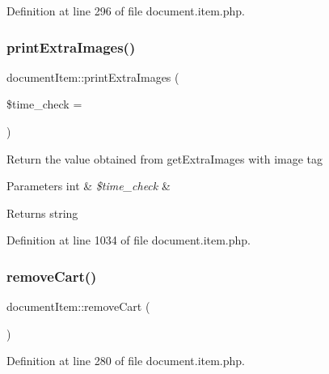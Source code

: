 Definition at line 296 of file document.\+item.\+php.

\mbox{\label{classdocumentItem_a9d185a16e4439823e7e4871c2fb0659a}} 
\subsubsection{\texorpdfstring{print\+Extra\+Images()}{printExtraImages()}}
{\footnotesize\ttfamily document\+Item\+::print\+Extra\+Images (\begin{DoxyParamCaption}\item[{}]{\$time\+\_\+check = {} }\end{DoxyParamCaption})}

Return the value obtained from get\+Extra\+Images with image tag 
\begin{DoxyParams}[1]{Parameters}
int & {\em \$time\+\_\+check} & \\
\hline
\end{DoxyParams}
\begin{DoxyReturn}{Returns}
string 
\end{DoxyReturn}


Definition at line 1034 of file document.\+item.\+php.

\mbox{\label{classdocumentItem_aa66932772c39aeff91238badd8246969}} 
\subsubsection{\texorpdfstring{remove\+Cart()}{removeCart()}}
{\footnotesize\ttfamily document\+Item\+::remove\+Cart (\begin{DoxyParamCaption}{ }\end{DoxyParamCaption})}



Definition at line 280 of file document.\+item.\+php.

\mbox{\label{classdocumentItem_a47d377b1f8ae94615b363f4f00bc94fc}} 
